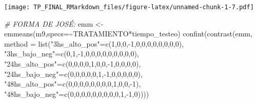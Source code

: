 \documentclass[
]{article}
\newenvironment{Shaded}{\begin{snugshade}}{\end{snugshade}}
\newcommand{\AttributeTok}[1]{\textcolor[rgb]{0.77,0.63,0.00}{#1}}
\newcommand{\CommentTok}[1]{\textcolor[rgb]{0.56,0.35,0.01}{\textit{#1}}}
\newcommand{\DecValTok}[1]{\textcolor[rgb]{0.00,0.00,0.81}{#1}}
\newcommand{\FunctionTok}[1]{\textcolor[rgb]{0.00,0.00,0.00}{#1}}
\newcommand{\NormalTok}[1]{#1}
\newcommand{\OtherTok}[1]{\textcolor[rgb]{0.56,0.35,0.01}{#1}}
\newcommand{\SpecialCharTok}[1]{\textcolor[rgb]{0.00,0.00,0.00}{#1}}
\newcommand{\StringTok}[1]{\textcolor[rgb]{0.31,0.60,0.02}{#1}}
\begin{document}
\texttt{[image: TP\_FINAL\_RMarkdown\_files/figure-latex/unnamed-chunk-1-7.pdf]}

\begin{Shaded}
\begin{Highlighting}[]
\CommentTok{\# FORMA DE JOSÉ:}
\NormalTok{emm }\OtherTok{\textless{}{-}} \FunctionTok{emmeans}\NormalTok{(m9,}\AttributeTok{specs=}\SpecialCharTok{\textasciitilde{}}\NormalTok{TRATAMIENTO}\SpecialCharTok{*}\NormalTok{tiempo\_testeo)}
\FunctionTok{confint}\NormalTok{(}\FunctionTok{contrast}\NormalTok{(emm, }\AttributeTok{method =} \FunctionTok{list}\NormalTok{(}\StringTok{"3hs\_alto\_pos"}\OtherTok{=}\FunctionTok{c}\NormalTok{(}\DecValTok{1}\NormalTok{,}\DecValTok{0}\NormalTok{,}\DecValTok{0}\NormalTok{,}\SpecialCharTok{{-}}\DecValTok{1}\NormalTok{,}\DecValTok{0}\NormalTok{,}\DecValTok{0}\NormalTok{,}\DecValTok{0}\NormalTok{,}\DecValTok{0}\NormalTok{,}\DecValTok{0}\NormalTok{,}\DecValTok{0}\NormalTok{,}\DecValTok{0}\NormalTok{,}\DecValTok{0}\NormalTok{), }
                     \StringTok{"3hs\_bajo\_neg"}\OtherTok{=}\FunctionTok{c}\NormalTok{(}\DecValTok{0}\NormalTok{,}\DecValTok{1}\NormalTok{,}\SpecialCharTok{{-}}\DecValTok{1}\NormalTok{,}\DecValTok{0}\NormalTok{,}\DecValTok{0}\NormalTok{,}\DecValTok{0}\NormalTok{,}\DecValTok{0}\NormalTok{,}\DecValTok{0}\NormalTok{,}\DecValTok{0}\NormalTok{,}\DecValTok{0}\NormalTok{,}\DecValTok{0}\NormalTok{,}\DecValTok{0}\NormalTok{), }
                     \StringTok{"24hs\_alto\_pos"}\OtherTok{=}\FunctionTok{c}\NormalTok{(}\DecValTok{0}\NormalTok{,}\DecValTok{0}\NormalTok{,}\DecValTok{0}\NormalTok{,}\DecValTok{0}\NormalTok{,}\DecValTok{1}\NormalTok{,}\DecValTok{0}\NormalTok{,}\DecValTok{0}\NormalTok{,}\SpecialCharTok{{-}}\DecValTok{1}\NormalTok{,}\DecValTok{0}\NormalTok{,}\DecValTok{0}\NormalTok{,}\DecValTok{0}\NormalTok{,}\DecValTok{0}\NormalTok{), }
                     \StringTok{"24hs\_bajo\_neg"}\OtherTok{=}\FunctionTok{c}\NormalTok{(}\DecValTok{0}\NormalTok{,}\DecValTok{0}\NormalTok{,}\DecValTok{0}\NormalTok{,}\DecValTok{0}\NormalTok{,}\DecValTok{0}\NormalTok{,}\DecValTok{1}\NormalTok{,}\SpecialCharTok{{-}}\DecValTok{1}\NormalTok{,}\DecValTok{0}\NormalTok{,}\DecValTok{0}\NormalTok{,}\DecValTok{0}\NormalTok{,}\DecValTok{0}\NormalTok{,}\DecValTok{0}\NormalTok{), }
                     \StringTok{"48hs\_alto\_pos"}\OtherTok{=}\FunctionTok{c}\NormalTok{(}\DecValTok{0}\NormalTok{,}\DecValTok{0}\NormalTok{,}\DecValTok{0}\NormalTok{,}\DecValTok{0}\NormalTok{,}\DecValTok{0}\NormalTok{,}\DecValTok{0}\NormalTok{,}\DecValTok{0}\NormalTok{,}\DecValTok{0}\NormalTok{,}\DecValTok{1}\NormalTok{,}\DecValTok{0}\NormalTok{,}\DecValTok{0}\NormalTok{,}\SpecialCharTok{{-}}\DecValTok{1}\NormalTok{), }
                     \StringTok{"48hs\_bajo\_neg"}\OtherTok{=}\FunctionTok{c}\NormalTok{(}\DecValTok{0}\NormalTok{,}\DecValTok{0}\NormalTok{,}\DecValTok{0}\NormalTok{,}\DecValTok{0}\NormalTok{,}\DecValTok{0}\NormalTok{,}\DecValTok{0}\NormalTok{,}\DecValTok{0}\NormalTok{,}\DecValTok{0}\NormalTok{,}\DecValTok{0}\NormalTok{,}\DecValTok{1}\NormalTok{,}\SpecialCharTok{{-}}\DecValTok{1}\NormalTok{,}\DecValTok{0}\NormalTok{))))}
\end{Highlighting}
\end{Shaded}
\end{document}
